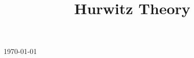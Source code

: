 

\title{Hurwitz Theory}

\usepackage[sort=standard]{glossaries} 
\makeglossaries



\maketitle
\centerline{\today}
\tableofcontents








